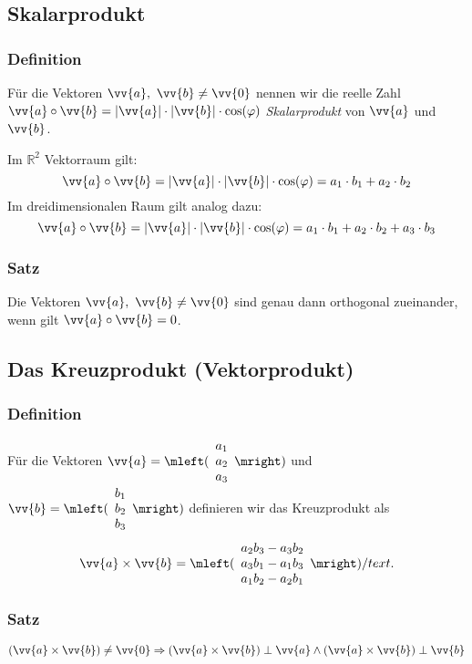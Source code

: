 \documentclass[a4paper,12pt]{article}
\newcommand{\R}{\mathbb{R}}
\begin{document}
\subsection{Skalarprodukt}
\subsubsection{Definition}
Für die Vektoren $\vv{a},\ \vv{b} \neq \vv{0}$ nennen wir die reelle Zahl $\vv{a} \circ \vv{b}=|\vv{a}| \cdot |\vv{b}| \cdot \cos (\varphi)$ \emph{Skalarprodukt} von $\vv{a}$ und $\vv{b}$. \par
Im $\R^2$ Vektorraum gilt:
\[ \vv{a} \circ \vv{b}=|\vv{a}| \cdot |\vv{b}| \cdot \cos (\varphi) = a_1\cdot b_1 + a_2 \cdot b_2 \]
Im dreidimensionalen Raum gilt analog dazu:
\[ \vv{a} \circ \vv{b}=|\vv{a}| \cdot |\vv{b}| \cdot \cos (\varphi) = a_1\cdot b_1 + a_2 \cdot b_2 + a_3 \cdot b_3 \]

\subsubsection{Satz}
Die Vektoren $\vv{a}, \ \vv{b} \neq \vv{0}$ sind genau dann orthogonal zueinander, wenn gilt $\vv{a} \circ \vv{b} = 0$.

\subsection{Das Kreuzprodukt (Vektorprodukt)}
\subsubsection{Definition}
Für die Vektoren $\vv{a}=\mleft( \begin{array}{c} a_1 \\ a_2 \\ a_3 \end{array}  \mright)$ und $\vv{b}=\mleft( \begin{array}{c} b_1 \\ b_2 \\ b_3 \end{array}  \mright)$ definieren wir das Kreuzprodukt als
\[ \vv{a} \times \vv{b} = \mleft( \begin{array}{c} a_2b_3-a_3b_2 \\ a_3b_1-a_1b_3 \\ a_1b_2-a_2b_1 \end{array}  \mright) /text{.}  \]

\subsubsection{Satz}
$(\vv{a} \times \vv{b}) \neq \vv{0} \Rightarrow (\vv{a} \times \vv{b}) \perp \vv{a} \land (\vv{a} \times \vv{b}) \perp \vv{b}$
\end{document}
